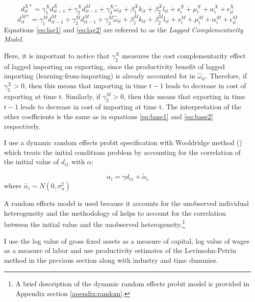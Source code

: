 \documentclass[12pt]{article}
\begin{document}
\begin{equation}
\label{eq:lag1}
d_{it}^{X*}=   \gamma_{1}^{X} d_{it-1}^{X} + \gamma_{2}^{X} d_{it-1}^{M}+
\gamma_{3}^{X} \hat{\omega}_{it}  + \beta_{1}^{X}k_{it}  +\beta_{2}^{X}l_{it}+
s_{i}^{X} + \mu_{t}^{X}  + \alpha_{i}^{X}+ \epsilon_{it}^{X}
\end{equation}
\begin{equation}
\label{eq:lag2}
d_{it}^{M*}=   \gamma_{1}^{M} d_{it-1}^{M} + \gamma_{2}^{M} d_{it-1}^{M}+
\gamma_{3}^{M} \hat{\omega}_{it}  + \beta_{1}^{M}k_{it}  +\beta_{2}^{M}l_{it}+
s_{i}^{M} + \mu_{t}^{M}  + \alpha_{i}^{M}+ \epsilon_{it}^{M}
\end{equation}
Equations \ref{eq:lag1} and \ref{eq:lag2} are referred to as the
\textit{Lagged Complementarity Model}. 

Here, it is important to notice that  $\gamma_{2}^{X}$ measures the
cost complementarity effect of lagged importing on
exporting, since the productivity benefit of lagged importing
(learning-from-importing) is already
accounted for in $\hat{\omega}_{it}$. Therefore, if $\gamma_{2}^{X}>0$, then this means that
importing in time $t-1$ leads to decrease in cost of exporting at time t.  
Similarly, if  $\gamma_{2}^{M}>0$, then this means that
exporting in time $t-1$ leads to decrease in cost of importing at time
t. The interpretation of the other coefficients is the same as in
equations \ref{eq:base1} and \ref{eq:base2} respectively. 
  
I use a dynamic random effects probit specification with Wooldridge
method (\textcite{wooldridge2005simple}) which treats the initial conditions problem by accounting for
the correlation of the initial value of $d_{i1}$ with $\alpha$:


$$  \alpha_{i}= \gamma d_{i1}+ \tilde{\alpha}_{i} $$
where $ \tilde{\alpha_{i}} \sim N(0, \sigma_{\alpha}^{2}) $

A random effects model is used because it accounts for the unobserved
individual heterogeneity and the methodology of
\textcite{wooldridge2005simple} helps to account for the correlation
between the initial value and the unobserved heterogeneity.\footnote{A
  brief description of the dynamic random effects probit model is
  provided in Appendix section \ref{apendix:random}.}
 
I use the log value of gross fixed assets as a measure of capital, log
value of wages as a measure of labor and use productivity estimates  of
the Levinsohn-Petrin method in the previous section along with
industry and time dummies.  
\end{document}
